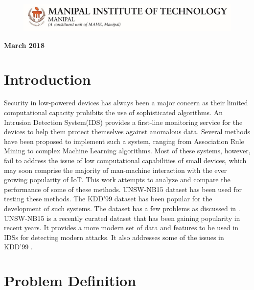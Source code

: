 \documentclass[a4paper,12pt]{article}
\begin{document}
\begin{titlepage}
		\begin{figure}[h]
	  	\begin{center}
		\includegraphics{MITLogo}
		\end{center}
		\end{figure}
		\begin{center}
		\textbf{March 2018}
		\end{center}

	\end{titlepage}

    \tableofcontents
    \listoffigures

	\newpage

	\section{Introduction}
	\paragraph{}
	Security in low-powered devices has always been a major concern as their limited computational capacity prohibits the use of sophisticated algorithms. An Intrusion Detection System(IDS) provides a first-line monitoring service for the devices to help them protect themselves against anomalous data. Several methods have been proposed to implement such a system, ranging from Association Rule Mining to complex Machine Learning algorithms. Most of these systems, however, fail to address the issue of low computational capabilities of small devices, which may soon comprise the majority of man-machine interaction with the ever growing popularity of IoT. This work attempts to analyze and compare the performance of some of these methods. UNSW-NB15 dataset has been used for testing these methods. The KDD'99 dataset has been popular for the development of such systems. The dataset has a few problems as discussed in \cite{unsw15}. UNSW-NB15 is a recently curated dataset that has been gaining popularity in recent years. It provides a more modern set of data and features to be used in IDSs for detecting modern attacks. It also addresses some of the issues in KDD'99 \cite{unsw15}.

	\section{Problem Definition}
\end{document}
